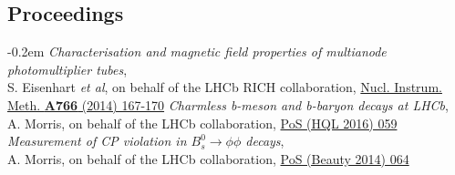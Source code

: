 \documentclass[contbibnum]{simplecv}
\begin{document}
	\subsection{Proceedings}
	\vspace{-0.5em}
	\begin{thebibliography}{2}
		\itemsep-0.2em
		\textit{Characterisation and magnetic field properties of multianode photomultiplier tubes},\\S. Eisenhart \textit{et al}, on behalf of the LHCb RICH collaboration, \href{http://dx.doi.org/10.1016/j.nima.2014.05.036}{Nucl. Instrum. Meth. \textbf{A766} (2014) 167-170}
		\textit{Charmless b-meson and b-baryon decays at LHCb},\\A. Morris, on behalf of the LHCb collaboration, \href{https://pos.sissa.it/cgi-bin/reader/contribution.cgi?id=274/059}{PoS (HQL 2016) 059}
		\textit{Measurement of CP violation in $B^0_s \to \phi\phi$ decays},\\A. Morris, on behalf of the LHCb collaboration, \href{https://pos.sissa.it/cgi-bin/reader/contribution.cgi?id=216/064}{PoS (Beauty 2014) 064}
	\end{thebibliography}
\end{document}
